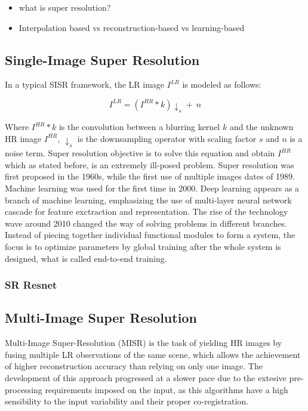     

\begin{itemize}
    \item what is super resolution?
    \item Interpolation based vs reconstruction-based vs learning-based
\end{itemize}

    \subsection{Single-Image Super Resolution}

        In a typical SISR framework, the LR image $I^{LR}$ is modeled as follows:
    
        \begin{equation}
            I^{LR} = ( I^{HR} \ast k) \downarrow_s + \ n
        \end{equation}
    
        Where $I^{HR} \ast k$ is the convolution between a blurring kernel $k$ and the unknown  HR image  $I^{HR}$, $\downarrow_s$ is the downsampling operator with scaling factor $s$ and $n$ is a noise term. Super resolution objective is to solve this equation and obtain $I^{HR}$ which as stated before, is an extremely ill-posed problem. Super resolution was first proposed in the 1960s, while the first use of multiple images dates of 1989. Machine learning was used for the first time in 2000. Deep learning appears as a branch of machine learning, emphasizing the use of multi-layer neural network cascade for feature exctraction and representation. The rise of the technology wave around 2010 changed the way of solving problems in different branches. Instead of piecing together individual functional modules to form a system, the focus is to optimize parameters by global training after the whole system is designed, what is called end-to-end training. 
        \subsubsection{SR Resnet}
    \subsection{Multi-Image Super Resolution}

        Multi-Image Super-Resolution (MISR) is the task of yielding HR images by fusing multiple LR observations of the same scene, which allows the achievement of higher reconstruction accuracy than relying on only one image. The development of this approach progressed at a slower pace due to the extesive pre-processing requirements imposed on the input, as this algorithms have a high sensibility to the input variability and their proper co-registration.  

